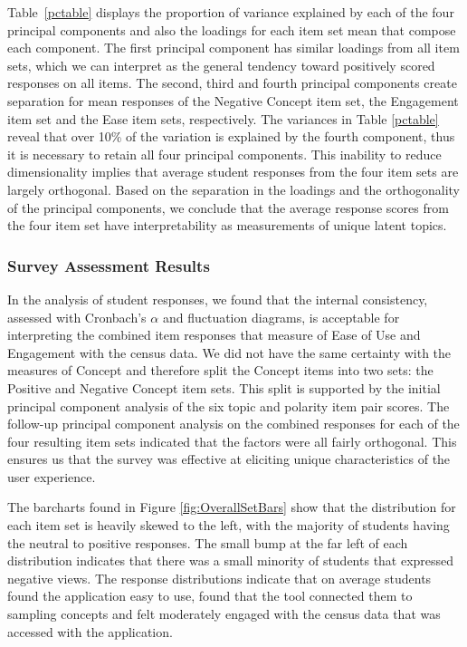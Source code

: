 \documentclass{article}\usepackage[]{graphicx}\usepackage[]{color}
\newcommand{\km}[1]{{\color{Orange} #1}}
\begin{document}
Table~\ref{pctable} displays the proportion of variance explained by each of the four principal components and also the loadings for each item set mean that compose each component. The first principal component has similar loadings from all item sets, which we can interpret as the general tendency toward positively scored responses on all items. The second, third and fourth principal components create separation for mean responses of the Negative Concept item set, the Engagement item set and the Ease item sets, respectively. The variances in Table \ref{pctable} reveal that over 10\% of the variation is explained by the fourth component, thus it is necessary to retain all four principal components. This inability to reduce dimensionality implies that average student responses from the four item sets are largely orthogonal. Based on the separation in the loadings and the orthogonality of the principal components, we conclude that the average response scores from the four item set have interpretability as measurements of unique latent topics. \\  


\subsubsection{Survey Assessment Results} 

\km{  In the analysis of student responses, we found that the internal consistency, assessed with Cronbach's $\alpha$ and fluctuation diagrams, is acceptable for interpreting the combined item responses that measure of Ease of Use and Engagement with the census data. We did not have the same certainty with the measures of Concept and therefore split the Concept items into two sets: the Positive and Negative Concept item sets.  This split is supported by the initial principal component analysis of the six topic and polarity item pair scores.  The follow-up principal component analysis on the combined responses for each of the four resulting item sets indicated that the factors were all fairly orthogonal. This ensures us that the survey was effective at eliciting unique characteristics of the user experience. \\  }

\km{ The barcharts found in Figure \ref{fig:OverallSetBars} show that the distribution for each item set is heavily skewed to the left, with the majority of students having the neutral to positive responses. The small bump at the far left of each distribution indicates that there was a small minority of students that expressed negative views. The response distributions indicate that on average students found the application easy to use, found that the tool connected them to sampling concepts and felt moderately engaged with the census data that was accessed with the application.  \\  }
\end{document}
